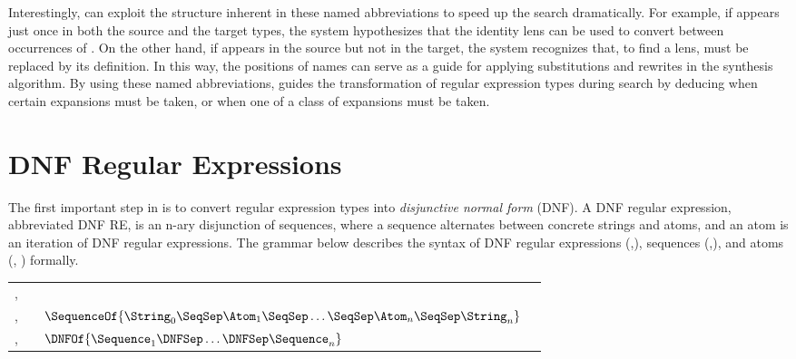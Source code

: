 \documentclass[sigplan,acmsmall]{acmart}
\begin{document}
Interestingly, \Optician{} can exploit the structure inherent in these named
abbreviations to speed up the search dramatically.  For example, if
\TextChar{} appears just once in both the source and the target types, the system
hypothesizes that the identity lens can be used to convert between
occurrences of \TextChar{}.  On the other hand, if \TextChar{} appears in the
source but not in the target, the system recognizes that, to find a lens,
\TextChar{} must be replaced by its
definition.  In this way, the positions of names
can serve as a guide for applying substitutions and rewrites in the
synthesis algorithm.  By using these named abbreviations, \TypeProp{} guides the 
transformation of regular expression types
during search by deducing when certain expansions must be taken, or when one of
a class of expansions must be taken.



\section{DNF Regular Expressions}
\label{sec:dnfre}


The first important step in \Optician{} is to convert
regular expression types into \emph{disjunctive normal form} (DNF).
A DNF regular expression, abbreviated DNF RE, is an n-ary disjunction of
sequences, where a sequence alternates between concrete strings and
atoms, and an atom is an iteration of DNF regular expressions.
The grammar below describes the syntax of 
DNF regular expressions (\DNFRegex{},\DNFRegexAlt{}),
sequences (\Sequence{},\SequenceAlt{}), and atoms (\Atom, \AtomAlt)
formally.

\begin{center}
  \begin{tabular}{l@{\ }c@{\ }l@{\ }>{\itshape\/}r}
    \Atom{},\AtomAlt{} & \GEq{} & \StarOf{\DNFRegex{}}
\\
    \Sequence{},\SequenceAlt{} & \GEq{} &
                                                       $\SequenceOf{\String_0\SeqSep\Atom_1\SeqSep\ldots\SeqSep\Atom_n\SeqSep\String_n}$ 
\\
    \DNFRegex{},\DNFRegexAlt{} & \GEq{} & $\DNFOf{\Sequence_1\DNFSep\ldots\DNFSep\Sequence_n}$ %
  \end{tabular}
\end{center}
\end{document}
